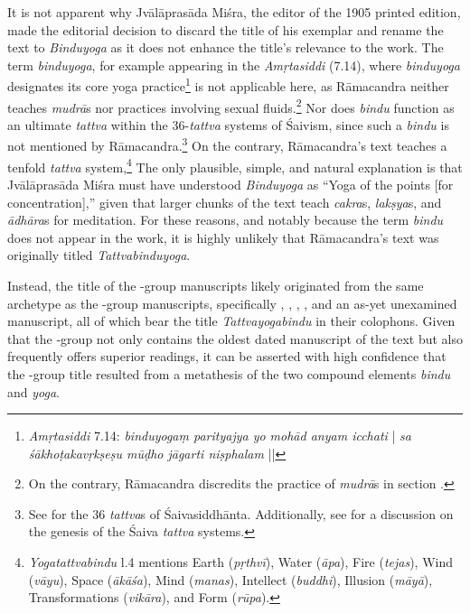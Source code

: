 It is not apparent why Jvālāprasāda Miśra, the editor of the 1905 printed edition, made the editorial decision to discard the title of his exemplar and rename the text to \emph{Binduyoga} as it does not enhance the title's relevance to the work. The term \textit{binduyoga}, for example appearing in the \emph{Amṛtasiddi} (7.14), where \textit{binduyoga} designates its core yoga practice\footnote{\emph{Amṛtasiddi} 7.14: \textit{binduyogaṃ parityajya yo mohād anyam icchati} | \textit{sa śākhoṭakavṛkṣeṣu mūḍho jāgarti niṣphalam} ||} is not applicable here, as Rāmacandra neither teaches \textit{mudrā}s nor practices involving sexual fluids.\footnote{On the contrary, Rāmacandra discredits the practice of \textit{mudrā}s in section .} Nor does \textit{bindu} function as an ultimate \textit{tattva} within the 36-\textit{tattva} systems of Śaivism, since such a \textit{bindu} is not mentioned by Rāmacandra.\footnote{See \citeauthor[1996: 177]{gengnagel1996} for the 36 \textit{tattva}s of Śaivasiddhānta. Additionally, see \citeauthor[2016: 77 et seqq.]{goodall2016tattvas} for a discussion on the genesis of the Śaiva \textit{tattva} systems.} On the contrary, Rāmacandra's text teaches a tenfold \textit{tattva} system,\footnote{\emph{Yogatattvabindu}  l.4 mentions Earth (\textit{pṛthvī}), Water (\textit{āpa}), Fire (\textit{tejas}), Wind (\textit{vāyu}), Space (\textit{ākāśa}), Mind (\textit{manas}), Intellect (\textit{buddhi}), Illusion (\textit{māyā}), Transformations (\textit{vikāra}), and Form (\textit{rūpa}).} The only plausible, simple, and natural explanation is that Jvālāprasāda Miśra must have understood \emph{Binduyoga} as ``Yoga of the points [for concentration],'' given that larger chunks of the text teach \textit{cakra}s, \textit{lakṣya}s, and \textit{ādhāra}s for meditation. For these reasons, and notably because the term \textit{bindu} does not appear in the work, it is highly unlikely that Rāmacandra's text was originally titled \emph{Tattvabinduyoga}.

Instead, the title of the \beta-group manuscripts likely originated from the same archetype as the \alpha-group manuscripts, specifically , , , , and an as-yet unexamined manuscript, all of which bear the title \emph{Tattvayogabindu} in their colophons. Given that the \alpha-group not only contains the oldest dated manuscript of the text but also frequently offers superior readings, it can be asserted with high confidence that the \beta-group title resulted from a metathesis of the two compound elements \textit{bindu} and \textit{yoga}.

